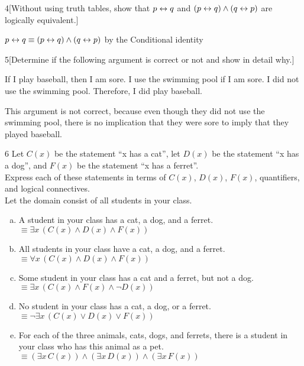\documentclass{homework}
\begin{document}
\begin{problem}{4}[Without using truth tables, show that $p \leftrightarrow q$ and $(p \leftrightarrow q) \land (q \leftrightarrow p)$ are logically equivalent.]

$p \leftrightarrow q \equiv (p \leftrightarrow q) \land (q \leftrightarrow p)$ by the Conditional identity

\end{problem}


\begin{problem}{5}[Determine if the following argument is correct or not and show in detail why.]
\begin{quoted}
If I play baseball, then I am sore. I use the swimming pool if I am sore. I did not use the swimming pool.
Therefore, I did play baseball.
\end{quoted}

This argument is not correct, because even though they did not use the swimming pool, there is no implication that they were sore to imply that they played baseball.

\end{problem}


\begin{problem}{6}
Let $C(x)$ be the statement ``x has a cat'', let $D(x)$ be the statement ``x has a dog'', and $F(x)$ be the statement ``x has a ferret''. \\
Express each of these statements in terms of $C(x)$, $D(x)$, $F(x)$, quantifiers, and logical connectives. \\
Let the domain consist of all students in your class.

\begin{enumerate}[(a)]
\item A student in your class has a cat, a dog, and a ferret. \\ 
  $\equiv \exists x \, (C(x) \land D(x) \land F(x))$ 

\item All students in your class have a cat, a dog, and a ferret. \\ 
  $\equiv \forall x \, (C(x) \land D(x) \land F(x))$ 

\item Some student in your class has a cat and a ferret, but not a dog. \\ 
  $\equiv \exists x \, (C(x) \land F(x) \land \neg D(x) )$ 
  
\item No student in your class has a cat, a dog, or a ferret. \\ 
  $\equiv \neg \exists x \, (C(x) \lor D(x) \lor F(x))$ 
  
\item For each of the three animals, cats, dogs, and ferrets, there is a student in your class who has this animal as a pet. \\ 
  $\equiv (\exists x \, C(x)) \land (\exists x \, D(x)) \land (\exists x \, F(x))$
  
\end{enumerate}
\end{problem}
\end{document}
